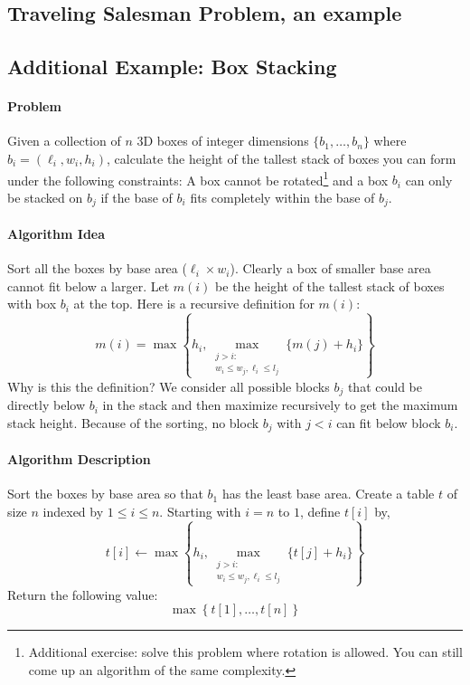 \documentclass[11pt]{article}
\theoremstyle{plain}
\theoremstyle{definition}
\numberwithin{equation}{section}
\numberwithin{figure}{section}
\begin{document}
\subsection{Traveling Salesman Problem, an example}

\subsection{Additional Example: Box Stacking}

\paragraph{Problem} Given a collection of $n$ 3D boxes of integer dimensions $\{b_1, \ldots, b_n\}$ where $b_i = (\ell_i, w_i, h_i)$, calculate the height of the tallest stack of boxes you can form under the following constraints: A box cannot be rotated\footnote{Additional exercise: solve this problem where rotation is allowed. You can still come up an algorithm of the same complexity.} and a box $b_i$ can only be stacked on $b_j$ if the base of $b_i$ fits completely within the base of $b_j$.

\paragraph{Algorithm Idea} Sort all the boxes by base area ($\ell_i \times w_i$). Clearly a box of smaller base area cannot fit below a larger. Let $m(i)$ be the height of the tallest stack of boxes with box $b_i$ at the top. Here is a recursive definition for $m(i)$:
\begin{equation}
m(i) = \max \left\{ h_i, \max_{\substack{j > i : \\w_i \leq w_j, \ell_i \leq l_j }} \{ m(j) + h_i \} \right\}
\end{equation}
Why is this the definition? We consider all possible blocks $b_j$ that could be directly below $b_i$ in the stack and then maximize recursively to get the maximum stack height. Because of the sorting, no block $b_j$ with $j < i$ can fit below block $b_i$.

\paragraph{Algorithm Description} Sort the boxes by base area so that $b_1$ has the least base area. Create a table $t$ of size $n$ indexed by $1 \leq i \leq n$. Starting with $i = n$ to $1$, define $t[i]$ by,
\begin{equation}
t[i] \leftarrow \max \left\{ h_i, \max_{\substack{j > i : \\w_i \leq w_j, \ell_i \leq l_j }} \{ t[j] + h_i \} \right\}
\end{equation}
Return the following value:
\begin{equation}
\max \left \{t[1], \ldots, t[n] \right\}
\end{equation}
\end{document}
